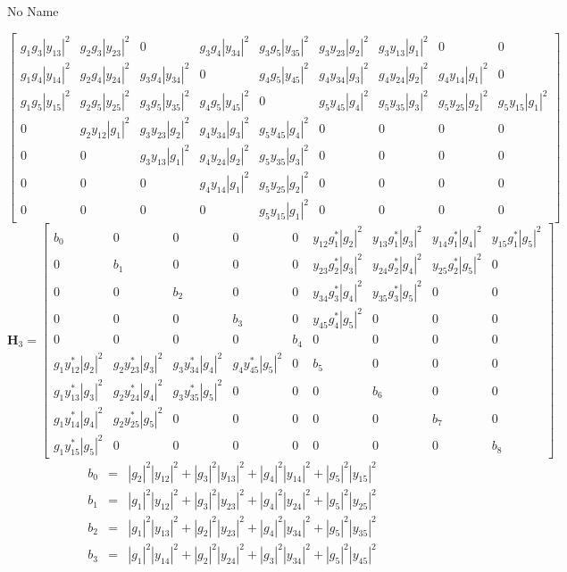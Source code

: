 \documentclass[a4paper,10pt]{article}
\begin{document}
\begin{section}{No Name}
\begin{landscape}
\begin{equation}
\begin{bmatrix}
g_1g_3|y_{13}|^2&g_2g_3|y_{23}|^2&0&g_3g_4|y_{34}|^2&g_3g_5|y_{35}|^2&g_3y_{23}|g_2|^2&g_3y_{13}|g_1|^2&0&0\\
g_1g_4|y_{14}|^2&g_2g_4|y_{24}|^2&g_3g_4|y_{34}|^2&0&g_4g_5|y_{45}|^2&g_4y_{34}|g_3|^2&g_4y_{24}|g_2|^2&g_4y_{14}|g_1|^2&0\\
g_1g_5|y_{15}|^2&g_2g_5|y_{25}|^2&g_3g_5|y_{35}|^2&g_4g_5|y_{45}|^2&0&g_5y_{45}|g_4|^2&g_5y_{35}|g_3|^2&g_5y_{25}|g_2|^2&g_5y_{15}|g_1|^2\\
0&g_2y_{12}|g_1|^2&g_3y_{23}|g_2|^2&g_4y_{34}|g_3|^2&g_5y_{45}|g_4|^2&0&0&0&0\\
0&0&g_3y_{13}|g_1|^2&g_4y_{24}|g_2|^2&g_5y_{35}|g_3|^2&0&0&0&0\\
0&0&0&g_4y_{14}|g_1|^2&g_5y_{25}|g_2|^2&0&0&0&0\\
0&0&0&0&g_5y_{15}|g_1|^2&0&0&0&0
\end{bmatrix}
\end{equation}
\begin{equation}
\boldsymbol{H}_3 = 
\begin{bmatrix}
b_{0}&0&0&0&0&y_{12}g_1^*|g_2|^2&y_{13}g_1^*|g_3|^2&y_{14}g_1^*|g_4|^2&y_{15}g_1^*|g_5|^2\\
0&b_{1}&0&0&0&y_{23}g_2^*|g_3|^2&y_{24}g_2^*|g_4|^2&y_{25}g_2^*|g_5|^2&0\\
0&0&b_{2}&0&0&y_{34}g_3^*|g_4|^2&y_{35}g_3^*|g_5|^2&0&0\\
0&0&0&b_{3}&0&y_{45}g_4^*|g_5|^2&0&0&0\\
0&0&0&0&b_{4}&0&0&0&0\\
g_1y_{12}^*|g_2|^2&g_2y_{23}^*|g_3|^2&g_3y_{34}^*|g_4|^2&g_4y_{45}^*|g_5|^2&0&b_{5}&0&0&0\\
g_1y_{13}^*|g_3|^2&g_2y_{24}^*|g_4|^2&g_3y_{35}^*|g_5|^2&0&0&0&b_{6}&0&0\\
g_1y_{14}^*|g_4|^2&g_2y_{25}^*|g_5|^2&0&0&0&0&0&b_{7}&0\\
g_1y_{15}^*|g_5|^2&0&0&0&0&0&0&0&b_{8}
\end{bmatrix}
\end{equation}
\begin{eqnarray}
b_{0} &=& |g_2|^2|y_{12}|^2 + |g_3|^2|y_{13}|^2 + |g_4|^2|y_{14}|^2 + |g_5|^2|y_{15}|^2\\
b_{1} &=& |g_1|^2|y_{12}|^2 + |g_3|^2|y_{23}|^2 + |g_4|^2|y_{24}|^2 + |g_5|^2|y_{25}|^2\\
b_{2} &=& |g_1|^2|y_{13}|^2 + |g_2|^2|y_{23}|^2 + |g_4|^2|y_{34}|^2 + |g_5|^2|y_{35}|^2\\
b_{3} &=& |g_1|^2|y_{14}|^2 + |g_2|^2|y_{24}|^2 + |g_3|^2|y_{34}|^2 + |g_5|^2|y_{45}|^2\\

\end{eqnarray}
\end{landscape}
\end{section}
\end{document}
